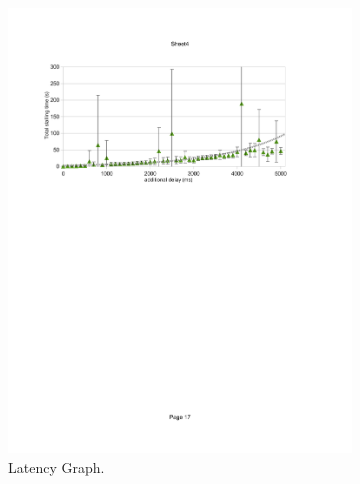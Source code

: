 \begin{figure}
	\centering
    	\begin{subfigure}[b]{0.50\textwidth}
                \centering
                \includegraphics[width=\textwidth]{images/streaming/delay.pdf}
                \caption{Latency Graph.}
                \label{fig:delayseries}
        \end{subfigure}%
        ~
    	\begin{subfigure}[b]{0.50\textwidth}
                \centering

\end{subfigure}
\end{figure}
